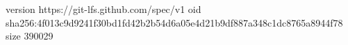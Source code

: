 version https://git-lfs.github.com/spec/v1
oid sha256:4f013c9d9241f30bd1fd42b2b54d6a05e4d21b9df887a348c1dc8765a8944f78
size 390029
